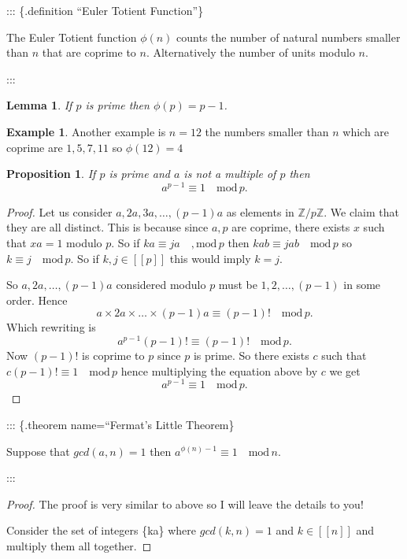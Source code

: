 \documentclass[
]{book}
\newtheorem{lemma}{Lemma}[chapter]
\newtheorem{proposition}{Proposition}[chapter]
\theoremstyle{definition}
\theoremstyle{definition}
\newtheorem{example}{Example}[chapter]
\theoremstyle{definition}
\theoremstyle{definition}
\theoremstyle{remark}
\begin{document}
::: \{.definition ``Euler Totient Function''\}

The Euler Totient function \(\phi(n)\) counts the number of natural numbers smaller than \(n\) that are coprime to \(n\). Alternatively the number of units modulo \(n\).

:::

\begin{lemma}
If \(p\) is prime then \(\phi(p) = p-1\).
\end{lemma}

\begin{example}
Another example is \(n=12\) the numbers smaller than \(n\) which are coprime are \(1,5,7,11\) so \(\phi(12)=4\)
\end{example}

\begin{proposition}
If \(p\) is prime and \(a\) is not a multiple of \(p\) then
\[ a^{p-1} \equiv 1 \quad \mbox{mod} \, p.  \]
\end{proposition}

\begin{proof}
Let us consider \(a, 2a, 3a, \dots, (p-1)a\) as elements in \(\mathbb{Z}/p\mathbb{Z}\). We claim that they are all distinct. This is because since \(a,p\) are coprime, there exists \(x\) such that \(xa =1\) modulo \(p\). So if \(ka \equiv ja \quad, \mbox{mod} \,p\) then \(kab \equiv jab \quad \mbox{mod} \, p\) so \(k \equiv j \quad \mbox{mod}\, p\). So if \(k, j \in [[p]]\) this would imply \(k = j\).

So \(a, 2a, \dots, (p-1)a\) considered modulo \(p\) must be \(1, 2, \dots, (p-1)\) in some order. Hence
\[ a \times 2a \times \dots \times (p-1)a \equiv (p-1)! \quad \mbox{mod}\, p. \] Which rewriting is
\[ a^{p-1} (p-1)! \equiv (p-1)! \quad \mbox{mod} \, p. \] Now \((p-1)!\) is coprime to \(p\) since \(p\) is prime. So there exists \(c\) such that \(c(p-1)! \equiv 1 \quad \mbox{mod}\, p\) hence multiplying the equation above by \(c\) we get
\[ a^{p-1} \equiv 1 \quad \mbox{mod} \, p.  \]
\end{proof}

::: \{.theorem name=``Fermat's Little Theorem\}

Suppose that \(gcd(a,n) =1\) then \(a^{\phi(n)-1} \equiv 1 \quad \mbox{mod} \, n\).

:::

\begin{proof}
The proof is very similar to above so I will leave the details to you!

Consider the set of integers \{ka\} where \(gcd(k,n) =1\) and \(k \in [[n]]\) and multiply them all together.
\end{proof}
\end{document}
